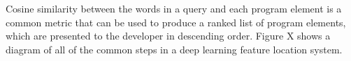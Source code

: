 Cosine similarity between the words in a query and each program
element is a common metric that can be used to produce a ranked list
of program elements, which are presented to the developer in
descending order. Figure X shows a diagram of all of the common steps
in a deep learning feature location system.








%


%







